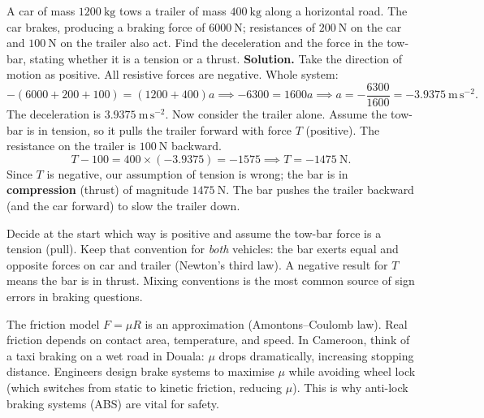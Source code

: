 \documentclass[11pt]{article}
\begin{document}
\begin{exoresolu}
A car of mass $1200\ \mathrm{kg}$ tows a trailer of mass $400\ \mathrm{kg}$ along a horizontal road. The car brakes, producing a braking force of $6000\ \mathrm{N}$; resistances of $200\ \mathrm{N}$ on the car and $100\ \mathrm{N}$ on the trailer also act. Find the deceleration and the force in the tow-bar, stating whether it is a tension or a thrust.
\tcblower
\textbf{Solution.} Take the direction of motion as positive. All resistive forces are negative.
Whole system:
\[ -(6000 + 200 + 100) = (1200 + 400)a \implies -6300 = 1600a \implies a = -\frac{6300}{1600} = -3.9375\ \mathrm{m\,s^{-2}}. \]
The deceleration is $3.9375\ \mathrm{m\,s^{-2}}$.
Now consider the trailer alone. Assume the tow-bar is in tension, so it pulls the trailer forward with force $T$ (positive). The resistance on the trailer is $100\ \mathrm{N}$ backward.
\[ T - 100 = 400 \times (-3.9375) = -1575 \implies T = -1475\ \mathrm{N}. \]
Since $T$ is negative, our assumption of tension is wrong; the bar is in \textbf{compression} (thrust) of magnitude $1475\ \mathrm{N}$. The bar pushes the trailer backward (and the car forward) to slow the trailer down.
\end{exoresolu}

\begin{attention}
Decide at the start which way is positive and assume the tow-bar force is a tension (pull). Keep that convention for \emph{both} vehicles: the bar exerts equal and opposite forces on car and trailer (Newton's third law). A negative result for $T$ means the bar is in thrust. Mixing conventions is the most common source of sign errors in braking questions.
\end{attention}

\begin{savaistu}
The friction model $F = \mu R$ is an approximation (Amontons–Coulomb law). Real friction depends on contact area, temperature, and speed. In Cameroon, think of a taxi braking on a wet road in Douala: $\mu$ drops dramatically, increasing stopping distance. Engineers design brake systems to maximise $\mu$ while avoiding wheel lock (which switches from static to kinetic friction, reducing $\mu$). This is why anti-lock braking systems (ABS) are vital for safety.
\end{savaistu}
\end{document}
